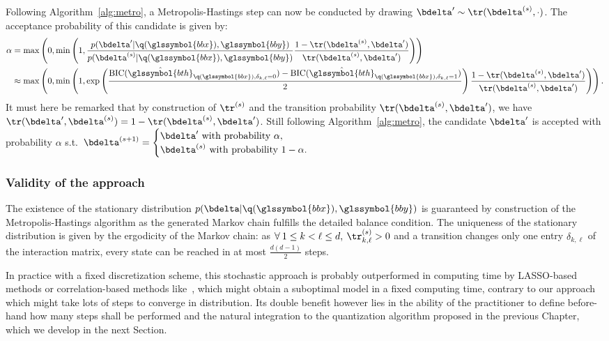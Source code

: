 Following Algorithm~\eqref{alg:metro}, a Metropolis-Hastings step can now be conducted by drawing $\bdelta' \sim \tr(\bdelta^{(s)},\cdot)$. The acceptance probability of this candidate is given by:
\begin{align*}
\alpha & = \max \left( 0, \min \left( 1, \frac{p(\bdelta' | \q(\glssymbol{bbx}), \glssymbol{bby})}{p(\bdelta^{(s)} | \q(\glssymbol{bbx}), \glssymbol{bby})} \frac{1-\tr(\bdelta^{(s)},\bdelta')}{\tr(\bdelta^{(s)},\bdelta')} \right) \right) \\
& \approx \max \left( 0, \min \left( 1, \exp \left( \frac{\text{BIC}(\hat{\glssymbol{bth}}_{\q(\glssymbol{bbx}),\delta_{k,\ell}=0}) - \text{BIC}(\hat{\glssymbol{bth}}_{\q(\glssymbol{bbx}),\delta_{k,\ell}=1})}{2} \right) \frac{1-\tr(\bdelta^{(s)},\bdelta')}{\tr(\bdelta^{(s)},\bdelta')} \right) \right).
\end{align*}
It must here be remarked that by construction of $\tr^{(s)}$ and the transition probability $\tr(\bdelta^{(s)},\bdelta')$, we have $\tr(\bdelta',\bdelta^{(s)}) = 1 - \tr(\bdelta^{(s)},\bdelta')$. Still following Algorithm~\eqref{alg:metro}, the candidate $\bdelta'$ is accepted with probability $\alpha$ s.t.\ $\bdelta^{(s+1)} = \begin{cases} \bdelta' \text{ with probability } \alpha, \\ \bdelta^{(s)} \text{ with probability } 1-\alpha. \end{cases}$

\subsubsection{Validity of the approach}


The existence of the stationary distribution $p(\bdelta | \q(\glssymbol{bbx}),\glssymbol{bby})$ is guaranteed by construction of the Metropolis-Hastings algorithm as the generated Markov chain fulfills the detailed balance condition. The uniqueness of the stationary distribution is given by the ergodicity of the Markov chain: as $\forall \: 1 \leq  k < \ell \leq d, \: \tr_{k,\ell}^{(s)} > 0$ and a transition changes only one entry $\delta_{k,\ell}$ of the interaction matrix, every state can be reached in at most $\frac{d(d-1)}{2}$ steps.

In practice with a fixed discretization scheme, this stochastic approach is probably outperformed in computing time by LASSO-based methods or correlation-based methods like~\cite{simon}, which might obtain a suboptimal model in a fixed computing time, contrary to our approach which might take lots of steps to converge in distribution. Its double benefit however lies in the ability of the practitioner to define before-hand how many steps shall be performed and the natural integration to the quantization algorithm proposed in the previous Chapter, which we develop in the next Section.

